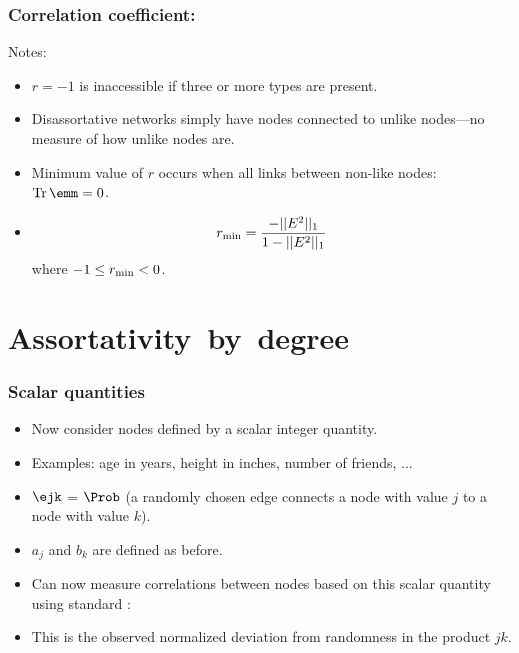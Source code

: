\begin{frame}
  \frametitle{Correlation coefficient:}

  \begin{block}{Notes:}
  \begin{itemize}
  \item<1->
    $r=-1$ is inaccessible if three or more types are present.
  \item<2->
    Disassortative networks
    simply have nodes connected to unlike nodes---no measure
    of how unlike nodes are.
  \item<3->
    Minimum value of $r$ occurs when all links between
    non-like nodes: $\textnormal{Tr}\, \emm = 0$.
  \item<4->
    $$
    r_{\textnormal{min}}
    =
    \frac{
      - || E^2 ||_1
    }
    {
      1 - || E^2 ||_1
    }
    $$
    where $-1 \le r_{\textnormal{min}} < 0$.
  \end{itemize}
  \end{block}

\end{frame}




\section{Assortativity\ by\ degree}

\begin{frame}
  \frametitle{Scalar quantities}

  \begin{itemize}
  \item<1->
    Now consider nodes defined by a scalar integer quantity.
  \item<2->
    Examples: age in years, height in inches, number of friends, ...
  \item<3->
    $\ejk$ = $\Prob$ (a randomly chosen edge connects a node with
    value $j$ to a node with value $k$).
  \item<4->
    $a_{j}$ and $b_{k}$ are defined as before.
  \item<5->
    Can now measure correlations between nodes based 
    on this scalar quantity using standard 
    :
    \item<7->
      This is the observed normalized deviation from randomness
      in the product $jk$.
    \end{itemize}

\end{frame}

